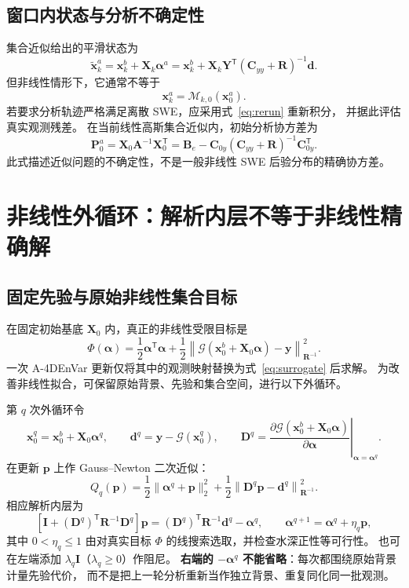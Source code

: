 \documentclass[11pt,a4paper]{article}
\newcommand{\T}{\mathsf T}
\newcommand{\Id}{\mathbf I}
\newcommand{\xx}{\mathbf x}
\newcommand{\yy}{\mathbf y}
\newcommand{\dd}{\mathbf d}
\newcommand{\avec}{\bm\alpha}
\newcommand{\norm}[2]{\left\|#1\right\|_{#2}}
\begin{document}
\subsection{窗口内状态与分析不确定性}

集合近似给出的平滑状态为
\begin{equation}
 \widetilde{\xx}_k^a=\xx_k^b+\mathbf X_k\avec^a
 =\xx_k^b+\mathbf X_k\mathbf Y^\T(\mathbf C_{yy}+\mathbf R)^{-1}\dd.
\end{equation}
但非线性情形下，它通常不等于
\begin{equation}
 \boxed{\xx_k^a=\mathcal M_{k,0}(\xx_0^a).}
 \label{eq:rerun}
\end{equation}
若要求分析轨迹严格满足离散 SWE，应采用式~\eqref{eq:rerun} 重新积分，
并据此评估真实观测残差。
在当前线性高斯集合近似内，初始分析协方差为
\begin{equation}
 \mathbf P_0^a=\mathbf X_0\mathbf A^{-1}\mathbf X_0^\T
 =\mathbf B_e-\mathbf C_{0y}(\mathbf C_{yy}+\mathbf R)^{-1}\mathbf C_{0y}^\T.
\end{equation}
此式描述近似问题的不确定性，不是一般非线性 SWE 后验分布的精确协方差。

\section{非线性外循环：解析内层不等于非线性精确解}

\subsection{固定先验与原始非线性集合目标}

在固定初始基底 $\mathbf X_0$ 内，真正的非线性受限目标是
\begin{equation}
 \Phi(\avec)=\frac12\avec^\T\avec+
 \frac12\norm{\mathcal G(\xx_0^b+\mathbf X_0\avec)-\yy}{\mathbf R^{-1}}^2.
 \label{eq:nonlinear}
\end{equation}
一次 A-4DEnVar 更新仅将其中的观测映射替换为式~\eqref{eq:surrogate} 后求解。
为改善非线性拟合，可保留原始背景、先验和集合空间，进行以下外循环。

第 $q$ 次外循环令
\begin{equation}
 \xx_0^q=\xx_0^b+\mathbf X_0\avec^q,\qquad
 \dd^q=\yy-\mathcal G(\xx_0^q),\qquad
 \mathbf D^q=\left.\frac{\partial\mathcal G(\xx_0^b+\mathbf X_0\avec)}{\partial\avec}
 \right|_{\avec=\avec^q}.
\end{equation}
在更新 $\mathbf p$ 上作 Gauss--Newton 二次近似：
\begin{equation}
 Q_q(\mathbf p)=\frac12\|\avec^q+\mathbf p\|_2^2
 +\frac12\norm{\mathbf D^q\mathbf p-\dd^q}{\mathbf R^{-1}}^2.
\end{equation}
相应解析内层为
\begin{equation}
 \boxed{[\Id+(\mathbf D^q)^\T\mathbf R^{-1}\mathbf D^q]\mathbf p
 =(\mathbf D^q)^\T\mathbf R^{-1}\dd^q-\avec^q,\qquad
 \avec^{q+1}=\avec^q+\eta_q\mathbf p,}
 \label{eq:outer}
\end{equation}
其中 $0<\eta_q\leq1$ 由对真实目标 $\Phi$ 的线搜索选取，并检查水深正性等可行性。
也可在左端添加 $\lambda_q\Id$（$\lambda_q\geq0$）作阻尼。
\textbf{右端的 $-\avec^q$ 不能省略}：每次都围绕原始背景计量先验代价，
而不是把上一轮分析重新当作独立背景、重复同化同一批观测。
\end{document}
